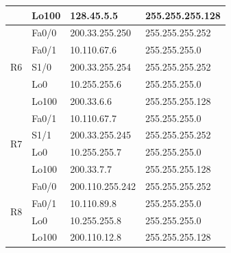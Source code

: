 \documentclass[12pt,twoside,a4paper]{report}
\begin{document}
\begin{table}[!htbp]
\begin{tabular}{|c|l|l|l|}
                     & Lo100                                   & 128.45.5.5                              & 255.255.255.128                     \\ \hline
\multirow{5}{*}{R6}  & Fa0/0                                   & 200.33.255.250                          & 255.255.255.252                     \\ \cline{2-4} 
                     & Fa0/1                                   & 10.110.67.6                             & 255.255.255.0                       \\ \cline{2-4} 
                     & S1/0                                    & 200.33.255.254                          & 255.255.255.252                     \\ \cline{2-4} 
                     & Lo0                                     & 10.255.255.6                            & 255.255.255.0                       \\ \cline{2-4} 
                     & Lo100                                   & 200.33.6.6                              & 255.255.255.128                     \\ \hline
\multirow{4}{*}{R7}  & Fa0/1                                   & 10.110.67.7                             & 255.255.255.0                       \\ \cline{2-4} 
                     & S1/1                                    & 200.33.255.245                          & 255.255.255.252                     \\ \cline{2-4} 
                     & Lo0                                     & 10.255.255.7                            & 255.255.255.0                       \\ \cline{2-4} 
                     & Lo100                                   & 200.33.7.7                              & 255.255.255.128                     \\ \hline
\multirow{4}{*}{R8}  & Fa0/0                                   & 200.110.255.242                         & 255.255.255.252                     \\ \cline{2-4} 
                     & Fa0/1                                   & 10.110.89.8                             & 255.255.255.0                       \\ \cline{2-4} 
                     & Lo0                                     & 10.255.255.8                            & 255.255.255.0                       \\ \cline{2-4} 
                     & Lo100                                   & 200.110.12.8                            & 255.255.255.128                     \\ \hline

\end{tabular}
\end{table}
\end{document}
